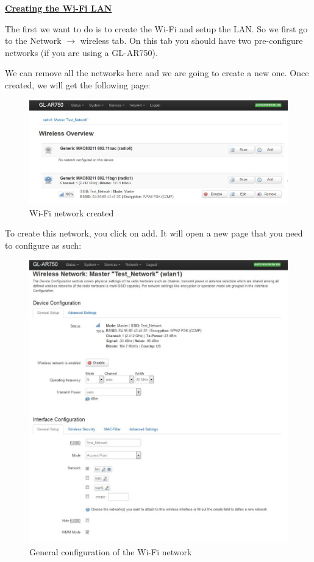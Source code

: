 \hfill \break \underline{\large{\textbf{Creating the Wi-Fi LAN}}}

The first we want to do is to create the Wi-Fi and setup the LAN. 
So we first go to the Network $\rightarrow$ wireless tab.
On this tab you should have two pre-configure networks (if you are using a GL-AR750).


We can remove all the networks here and we are going to create a new one. Once created, we will get the following page:
\begin{figure}[H]
\begin{center}
\includegraphics[width=\columnwidth]{image/wireless1.jpg}%
\caption{Wi-Fi network created}%
\label{figure:wireless1}%
\end{center}
\end{figure}



To create this network, you click on add. It will open a new page that you need to configure as such:
\begin{figure}[H]
\begin{center}
\includegraphics[width=\columnwidth]{image/wireless2.jpg}%
\caption{General configuration of the Wi-Fi network}%
\label{figure:wireless2}%
\end{center}
\end{figure}


